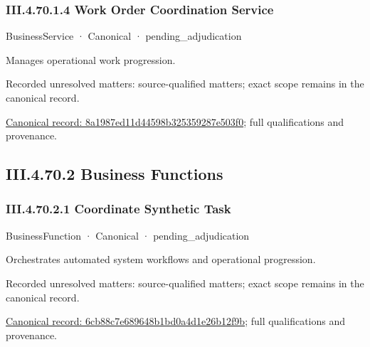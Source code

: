 \subsubsection*{III.4.70.1.4 Work Order Coordination Service}
\label{navigation:III.4.70.1.4}

\label{element:8a1987ed11d44598b325359287e503f0}
{\small BusinessService · Canonical · pending\_adjudication}\par

Manages operational work progression.


{\small Recorded unresolved matters: source-qualified matters; exact scope remains in the canonical record.}\par
{\footnotesize \href{../../../../continuum/business/business-service/8a1987ed11d44598b325359287e503f0.md}{Canonical record: 8a1987ed11d44598b325359287e503f0}; full qualifications and provenance.}\par
\subsection*{III.4.70.2 Business Functions}
\label{navigation:III.4.70.2}

\subsubsection*{III.4.70.2.1 Coordinate Synthetic Task}
\label{navigation:III.4.70.2.1}

\label{element:6cb88c7e689648b1bd0a4d1e26b12f9b}
{\small BusinessFunction · Canonical · pending\_adjudication}\par

Orchestrates automated system workflows and operational progression.


{\small Recorded unresolved matters: source-qualified matters; exact scope remains in the canonical record.}\par
{\footnotesize \href{../../../../continuum/business/business-function/6cb88c7e689648b1bd0a4d1e26b12f9b.md}{Canonical record: 6cb88c7e689648b1bd0a4d1e26b12f9b}; full qualifications and provenance.}\par
